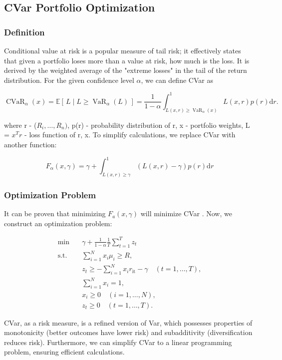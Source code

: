 \documentclass[12pt]{article}
\begin{document}
\subsection{CVar Portfolio Optimization}

\subsubsection{Definition}
Conditional value at risk is a popular measure of tail risk; it effectively states that given a portfolio loses more than a value at risk, how much is the loss. It is derived by the weighted average of the "extreme losses" in the tail of the return distribution. For the given confidence level $\alpha$, we can define CVar as 

\[
\operatorname{CVaR}_\alpha(x)
= \mathbb{E}\!\left[\,L \mid L \ge \operatorname{VaR}_\alpha(L)\,\right]
= \frac{1}{1-\alpha}\int_{L(x,r)\ge\operatorname{VaR}_\alpha(x)}^{1} L(x,r)p(r) \mathrm{d}r.
\]

where r - ($R_i,\dots,R_n)$, p(r) - probability distribution of r, x - portfolio weights, L = $x^Tr$ - loss function of r, x. To simplify calculations, we replace CVar with another function:

\[
F_\alpha(x, \gamma) = \gamma + \int_{L(x,r)\ge\gamma}^{1} (L(x,r) - \gamma)p(r) \mathrm{d}r
\]

\subsubsection{Optimization Problem}
It can be proven that minimizing $F_a(x,\gamma)$ will minimize CVar \cite{chekhlov2005}. Now, we construct an optimization problem:

\[
\begin{aligned}
\min_{\mathbf{}} \quad &  {\gamma + \frac{1}{1-\alpha}\frac{1}{T}\sum_{t=1}^T z_t}\ \\
\text{s.t.} \quad & \sum_{i=1}^{N} x_i\mu_i \geq R, \\
& z_t \ge -\sum_{i=1}^{N} x_ir_\text{it}-\gamma \quad (t=1,\dots,T),\\
& \sum_{i=1}^{N} x_i = 1, \\
& x_i \ge 0 \quad (i=1,\dots,N), \\
& z_t \ge 0 \quad (t=1,\dots,T).
\end{aligned}
\]

CVar, as a risk measure, is a refined version of Var, which possesses properties of monotonicity (better outcomes have lower risk) and subadditivity (diversification reduces risk). Furthermore, we can simplify CVar to a linear programming problem, ensuring efficient calculations. 
\end{document}
